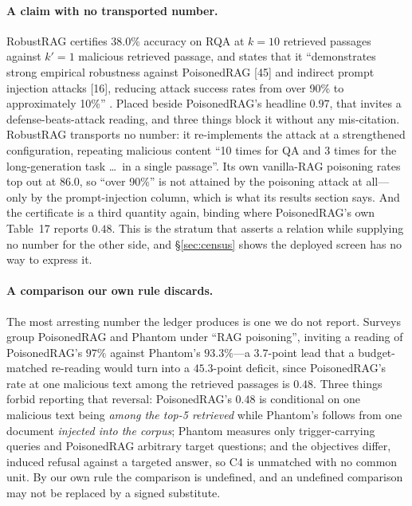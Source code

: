\documentclass[11pt]{article}
\begin{document}
\paragraph{A claim with no transported number.}
RobustRAG certifies $38.0\%$ accuracy on RQA at $k=10$ retrieved passages
against $k'=1$ malicious retrieved passage, and states that it ``demonstrates
strong empirical robustness against PoisonedRAG [45] and indirect prompt
injection attacks [16], reducing attack success rates from over 90\% to
approximately 10\%'' \citep{certifiedRAG2024}. Placed beside PoisonedRAG's
headline $0.97$, that invites a defense-beats-attack reading, and three things
block it without any mis-citation. RobustRAG transports no number: it
re-implements the attack at a strengthened configuration, repeating malicious
content ``10 times for QA and 3 times for the long-generation task \dots\ in a
single passage''. Its own vanilla-RAG poisoning rates top out at $86.0$, so
``over 90\%'' is not attained by the poisoning attack at all---only by the
prompt-injection column, which is what its results section says. And the
certificate is a third quantity again, binding where PoisonedRAG's own Table~17
reports $0.48$. This is the stratum that asserts a relation while supplying no
number for the other side, and \S\ref{sec:census} shows the deployed screen has
no way to express it.

\paragraph{A comparison our own rule discards.}
\label{sec:discarded}
The most arresting number the ledger produces is one we do not report. Surveys
group PoisonedRAG and Phantom under ``RAG poisoning'', inviting a reading of
PoisonedRAG's $97\%$ against Phantom's $93.3\%$---a $3.7$-point lead that a
budget-matched re-reading would turn into a $45.3$-point deficit, since
PoisonedRAG's rate at one malicious text among the retrieved passages is $0.48$.
Three things forbid reporting that reversal: PoisonedRAG's $0.48$ is conditional
on one malicious text being \emph{among the top-5 retrieved} while Phantom's
follows from one document \emph{injected into the corpus}; Phantom measures only
trigger-carrying queries and PoisonedRAG arbitrary target questions; and the
objectives differ, induced refusal against a targeted answer, so C4 is unmatched
with no common unit. By our own rule the comparison is undefined, and an
undefined comparison may not be replaced by a signed substitute.
\end{document}
